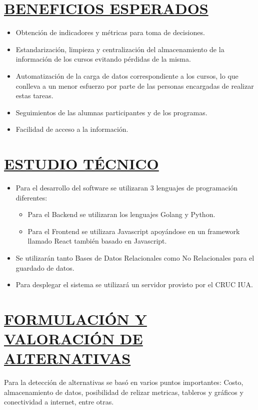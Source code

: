 \section*{\underline{BENEFICIOS ESPERADOS}}
\begin{itemize}
	\item Obtención de indicadores y métricas para toma de decisiones.
	\item Estandarización, limpieza y centralización del almacenamiento de la información de los cursos evitando pérdidas de la misma.
	\item Automatización de la carga de datos correspondiente a los cursos, lo que conlleva a un menor esfuerzo por parte de las personas encargadas de realizar estas tareas.
	\item Seguimientos de las alumnas participantes y de los programas.
	\item Facilidad de acceso a la información.\\
\end{itemize}


\section*{\underline{ESTUDIO TÉCNICO}}
\begin{itemize}
	\item Para el desarrollo del software se utilizaran 3 lenguajes de programación diferentes:
	\begin{itemize}
		\item Para el Backend se utilizaran los lenguajes Golang y Python.
		\item Para el Frontend se utilizara Javascript apoyándose en un framework llamado React también basado en Javascript.
	\end{itemize}
	\item Se utilizarán tanto Bases de Datos Relacionales como No Relacionales para el guardado de datos.
	\item Para desplegar el sistema se utilizará un servidor provisto por el CRUC IUA.\\
\end{itemize}



\section*{\underline{FORMULACIÓN Y VALORACIÓN DE ALTERNATIVAS}}
Para la detección de alternativas se basó en varios puntos importantes: Costo, almacenamiento de datos, posibilidad de relizar metricas, tableros y gráficos y conectividad a internet, entre otras.\\

